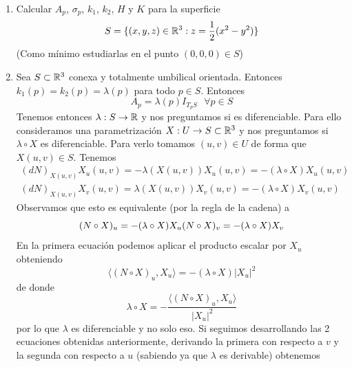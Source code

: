 \begin{ejercicio}\
    \begin{enumerate}
        \item Calcular $A_p$, $\sigma_p$, $k_1$, $k_2$, $H$ y $K$ para la superficie
        \begin{equation*}
            S = \{(x,y,z)\in \mathbb{R}^3 : z = \frac{1}{2}(x^2 - y^2)\}
        \end{equation*}
        (Como mínimo estudiarlas en el punto $(0,0,0)\in S$)

        \item Sea $S\subset \mathbb{R}^3$ conexa y totalmente umbilical orientada. Entonces $k_1(p)=k_2(p)=\lambda(p)$ para todo $p\in S$. Entonces 
        \begin{equation*}
            A_p = \lambda(p)I_{T_pS}\ \ \ \forall p \in S
        \end{equation*}
        Tenemos entonces $\lambda : S\to \mathbb{R}$ y nos preguntamos si es diferenciable. Para ello consideramos una parametrización $X:U\to S\subset \mathbb{R}^3$ y nos preguntamos si $\lambda \circ X$ es diferenciable. Para verlo tomamos $(u,v)\in U$ de forma que $X(u,v)\in S$. Tenemos
        \begin{gather*}
            (dN)_{X(u,v)} X_u(u,v) = - \lambda(X(u,v))X_u(u,v) = -(\lambda \circ X) X_u(u,v)\\
            (dN)_{X(u,v)} X_v(u,v) = \lambda(X(u,v))X_v(u,v) = -(\lambda \circ X) X_v(u,v)
        \end{gather*}
        Observamos que esto es equivalente (por la regla de la cadena) a  
        \begin{equation*}
            (N\circ X)_u = -(\lambda \circ X) X_u\\
            (N\circ X)_v = -(\lambda \circ X) X_v
        \end{equation*}
        En la primera ecuación podemos aplicar el producto escalar por $X_u$ obteniendo
        \begin{equation*}
            \langle (N \circ X)_u, X_u \rangle = - (\lambda \circ X) |X_u|^2
        \end{equation*}
        de donde
        \begin{equation*}
            \lambda \circ X = - \frac{\langle (N\circ X)_u, X_u \rangle}{|X_u|^2}
        \end{equation*}
        por lo que $\lambda$ es diferenciable y no solo eso. Si seguimos desarrollando las 2 ecuaciones obtenidas anteriormente, derivando la primera con respecto a $v$ y la segunda con respecto a $u$ (sabiendo ya que $\lambda$ es derivable) obtenemos

\end{enumerate}
\end{ejercicio}
